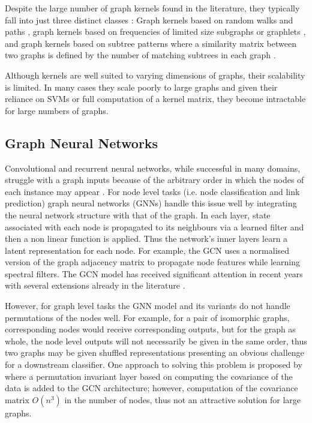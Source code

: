 \documentclass{article}
\theoremstyle{definition}
\begin{document}
Despite the large number of graph kernels found in the literature, they typically fall into just three distinct classes \cite{ShervashidzeNINOSHERVASHIDZE2011}: Graph kernels based on random walks and paths \cite{Borgwardt2005}, graph kernels based on frequencies of limited size subgraphs or graphlets \cite{Shervashidze2009}, and graph kernels based on subtree patterns where a similarity matrix between two graphs is defined by the number of matching subtrees in each graph \cite{Harchaoui2007}.



Although kernels are well suited to varying dimensions of graphs, their scalability is limited. In many cases they scale poorly to large graphs \cite{Shervashidze2010} and given their reliance on SVMs or full computation of a kernel matrix, they become intractable for large numbers of graphs.

\subsection{Graph Neural Networks}

Convolutional and recurrent neural networks, while successful in many domains, struggle with a graph inputs because of the arbitrary order in which the nodes of each instance may appear \cite{Ying2018b}. For node level tasks (i.e. node classification and link prediction) graph neural networks (GNNs) \cite{Scarselli2009} handle this issue well by integrating the neural network structure with that of the graph. In each layer, state associated with each node is propagated to its neighbours via a learned filter and then a non linear function is applied. Thus the network's inner layers learn a latent representation for each node. For example, the GCN \cite{Kipf2016} uses a normalised version of the graph adjacency matrix to propagate node features while learning spectral filters. The GCN model has received significant attention in recent years with several extensions already in the literature \cite{Hamilton2017b,Atwood2016,Romero2018}.

However, for graph level tasks the GNN model and its variants do not handle permutations of the nodes well. For example, for a pair of isomorphic graphs, corresponding nodes would receive corresponding outputs, but for the graph as whole, the node level outputs will not necessarily be given in the same order, thus two graphs may be given shuffled representations presenting an obvious challenge for a downstream classifier. One approach to solving this problem is proposed by \cite{Verma2018} where a permutation invariant layer based on computing the covariance of the data is added to the GCN architecture; however, computation of the covariance matrix $O(n^3)$ in the number of nodes, thus not an attractive solution for large graphs.
\end{document}
